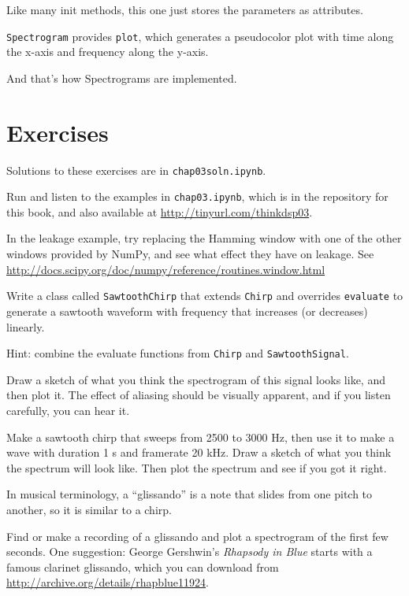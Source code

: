 \documentclass[12pt]{book}
\begin{document}
Like many init methods, this one just stores the
parameters as attributes.

{\tt Spectrogram} provides {\tt plot}, which generates a
pseudocolor plot with time along the x-axis and frequency along
the y-axis.

And that's how Spectrograms are implemented.


\section{Exercises}

Solutions to these exercises are in {\tt chap03soln.ipynb}.

\begin{exercise}
Run and listen to the examples in {\tt chap03.ipynb}, which is
in the repository for this book, and also available at
\url{http://tinyurl.com/thinkdsp03}.

In the leakage example, try replacing the Hamming window with one of
the other windows provided by NumPy, and see what effect they have on
leakage.  See
\url{http://docs.scipy.org/doc/numpy/reference/routines.window.html}
\end{exercise}


\begin{exercise}
Write a class called {\tt SawtoothChirp} that extends {\tt Chirp}
and overrides {\tt evaluate} to generate a sawtooth waveform with
frequency that increases (or decreases) linearly.

Hint: combine the evaluate functions from {\tt Chirp} and
{\tt SawtoothSignal}.

Draw a sketch of what you think the spectrogram of this signal
looks like, and then plot it.  The effect of aliasing should be
visually apparent, and if you listen carefully, you can hear it.
\end{exercise}


\begin{exercise}
Make a sawtooth chirp that sweeps from 2500 to 3000 Hz, then use it to
make a wave with duration 1 s and framerate 20 kHz.  Draw a sketch of
what you think the spectrum will look like.  Then plot the
spectrum and see if you got it right.
\end{exercise}


\begin{exercise}
In musical terminology, a ``glissando'' is a note that slides from one
pitch to another, so it is similar to a chirp.

Find or make a recording of a glissando and plot a spectrogram of the
first few seconds.  One suggestion: George Gershwin's {\it Rhapsody in
  Blue} starts with a famous clarinet glissando, which you can download
from \url{http://archive.org/details/rhapblue11924}.
\end{exercise}
\end{document}
